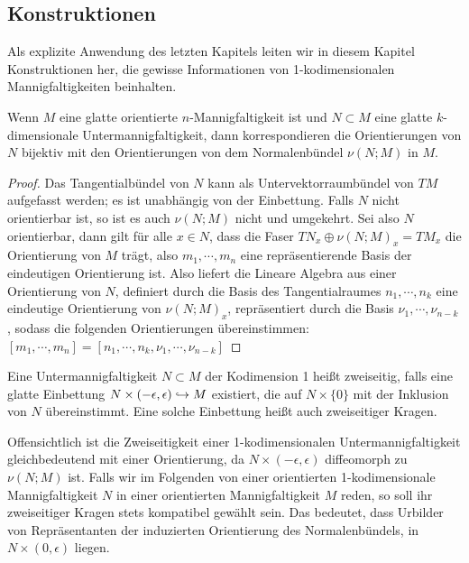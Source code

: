 	\subsection{Konstruktionen}
	Als explizite Anwendung des letzten Kapitels leiten wir in diesem Kapitel Konstruktionen her, die gewisse Informationen von 1-kodimensionalen Mannigfaltigkeiten beinhalten.
	\begin{lem}
		Wenn $M$ eine glatte orientierte $n$-Mannigfaltigkeit ist und $N\subset M$ eine glatte $k$-dimensionale Untermannigfaltigkeit, dann korrespondieren die Orientierungen von $N$ bijektiv mit den Orientierungen von dem Normalenbündel $\nu (N;M)$ in $M$.
	\end{lem}
	\begin{proof}
		Das Tangentialbündel von $N$ kann als Untervektorraumbündel von $TM$ aufgefasst werden; es ist unabhängig von der Einbettung. Falls $N$ nicht orientierbar ist, so ist es auch $\nu(N;M)$ nicht und umgekehrt. Sei also $N$ orientierbar, dann gilt für alle $x \in N$, dass die Faser $TN_x\oplus \nu(N;M)_x = TM_x$ die Orientierung von $M$ trägt, also $m_1,\cdots,m_n$ eine repräsentierende Basis der eindeutigen Orientierung ist. Also liefert die Lineare Algebra aus einer Orientierung von $N$, definiert durch die Basis des Tangentialraumes $n_1,\cdots,n_k$ eine eindeutige Orientierung von $\nu(N;M)_x$, repräsentiert durch die Basis $\nu_1,\cdots,\nu_{n-k}$, sodass die folgenden Orientierungen übereinstimmen: $[m_1,\cdots,m_n] = [n_1,\cdots,n_k,\nu_1,\cdots,\nu_{n-k}] $
	\end{proof}

	\begin{defn}
		Eine Untermannigfaltigkeit $N\subset M$ der Kodimension 1 heißt zweiseitig, falls eine glatte Einbettung $N \times (-\epsilon,\epsilon) \hookrightarrow M$ existiert, die auf $N \times \{0\} $ mit der Inklusion von $N$ übereinstimmt. Eine solche Einbettung heißt auch zweiseitiger Kragen.
	\end{defn}
	\begin{bem}
	\label{bem:zweiseitigkeit}
		Offensichtlich ist die Zweiseitigkeit einer 1-kodimensionalen Untermannigfaltigkeit gleichbedeutend mit einer Orientierung, da $N \times (-\epsilon,\epsilon)$ diffeomorph zu $\nu(N;M)$ ist. Falls wir im Folgenden von einer orientierten 1-kodimensionale Mannigfaltigkeit $N$ in einer orientierten Mannigfaltigkeit $M$ reden, so soll ihr zweiseitiger Kragen stets kompatibel gewählt sein. Das bedeutet, dass Urbilder von Repräsentanten der induzierten Orientierung des Normalenbündels, in $N\times (0,\epsilon)$ liegen.
	\end{bem}


